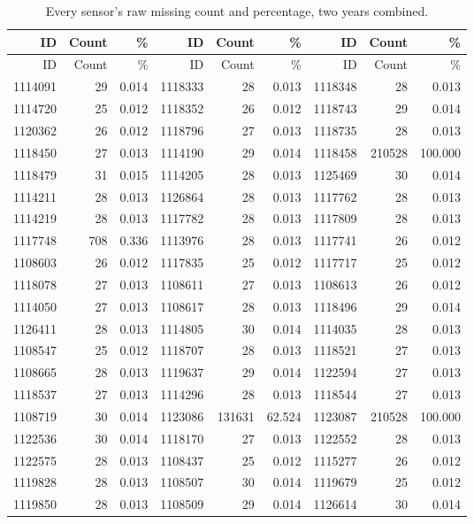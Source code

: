 \documentclass[11pt,a4paper]{article}
\begin{document}
\begin{longtable}{rrr|rrr|rrr}
\caption{Every sensor's raw missing count and percentage, two years combined.}\\
\toprule ID & Count & \% & ID & Count & \% & ID & Count & \%\\\midrule
\endfirsthead
\toprule ID & Count & \% & ID & Count & \% & ID & Count & \%\\\midrule\endhead
1114091 & 29 & 0.014 & 1118333 & 28 & 0.013 & 1118348 & 28 & 0.013\\
1114720 & 25 & 0.012 & 1118352 & 26 & 0.012 & 1118743 & 29 & 0.014\\
1120362 & 26 & 0.012 & 1118796 & 27 & 0.013 & 1118735 & 28 & 0.013\\
1118450 & 27 & 0.013 & 1114190 & 29 & 0.014 & 1118458 & 210528 & 100.000\\
1118479 & 31 & 0.015 & 1114205 & 28 & 0.013 & 1125469 & 30 & 0.014\\
1114211 & 28 & 0.013 & 1126864 & 28 & 0.013 & 1117762 & 28 & 0.013\\
1114219 & 28 & 0.013 & 1117782 & 28 & 0.013 & 1117809 & 28 & 0.013\\
1117748 & 708 & 0.336 & 1113976 & 28 & 0.013 & 1117741 & 26 & 0.012\\
1108603 & 26 & 0.012 & 1117835 & 25 & 0.012 & 1117717 & 25 & 0.012\\
1118078 & 27 & 0.013 & 1108611 & 27 & 0.013 & 1108613 & 26 & 0.012\\
1114050 & 27 & 0.013 & 1108617 & 28 & 0.013 & 1118496 & 29 & 0.014\\
1126411 & 28 & 0.013 & 1114805 & 30 & 0.014 & 1114035 & 28 & 0.013\\
1108547 & 25 & 0.012 & 1118707 & 28 & 0.013 & 1118521 & 27 & 0.013\\
1108665 & 28 & 0.013 & 1119637 & 29 & 0.014 & 1122594 & 27 & 0.013\\
1118537 & 27 & 0.013 & 1114296 & 28 & 0.013 & 1118544 & 27 & 0.013\\
1108719 & 30 & 0.014 & 1123086 & 131631 & 62.524 & 1123087 & 210528 & 100.000\\
1122536 & 30 & 0.014 & 1118170 & 27 & 0.013 & 1122552 & 28 & 0.013\\
1122575 & 28 & 0.013 & 1108437 & 25 & 0.012 & 1115277 & 26 & 0.012\\
1119828 & 28 & 0.013 & 1108507 & 30 & 0.014 & 1119679 & 25 & 0.012\\
1119850 & 28 & 0.013 & 1108509 & 29 & 0.014 & 1126614 & 30 & 0.014\\

\end{longtable}
\end{document}
